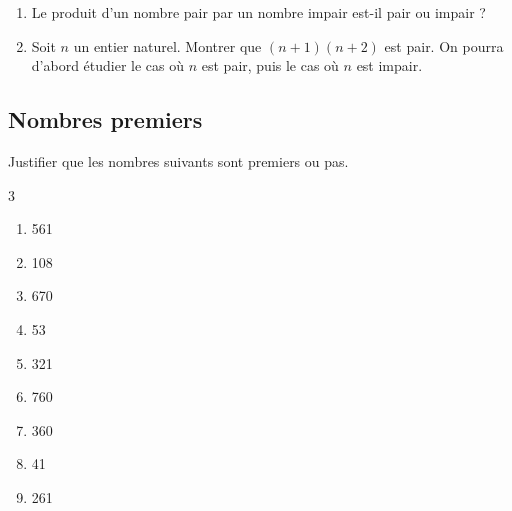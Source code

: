 {\begin{Exercice}
\leavevmode\vspace{-\baselineskip}
\begin{enumerate}

\item Le produit d'un nombre pair par un nombre impair est-il pair ou impair ?
\item Soit $ n $ un entier naturel. Montrer que $ (n + 1)(n + 2) $ est pair. On pourra d'abord étudier le cas où $ n $ est pair, puis le cas où $ n $ est impair.
\end{enumerate}
\end{Exercice}



\subsection*{Nombres premiers}

\begin{Exercice}
Justifier que les nombres suivants sont premiers ou pas.    
    \begin{multicols}{3}
\begin{enumerate}[itemsep=1em]
	\item \begin{minipage}[t]{\linewidth}561\end{minipage}
	\item \begin{minipage}[t]{\linewidth}108\end{minipage}
	\item \begin{minipage}[t]{\linewidth}670\end{minipage}
	\item \begin{minipage}[t]{\linewidth}53\end{minipage}
	\item \begin{minipage}[t]{\linewidth}321\end{minipage}
	\item \begin{minipage}[t]{\linewidth}760\end{minipage}
	\item \begin{minipage}[t]{\linewidth}360\end{minipage}
	\item \begin{minipage}[t]{\linewidth}41\end{minipage}
	\item \begin{minipage}[t]{\linewidth}261\end{minipage}
\end{enumerate}
\end{multicols}
\end{Exercice}

}
